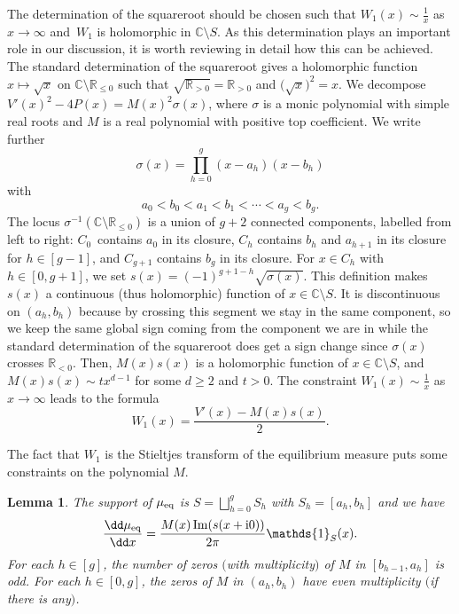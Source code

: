 \documentclass[10pt,a4paper]{amsart}
\numberwithin{equation}{section}
\newtheorem{Lemma}[Theorem]{Lemma}
\newcommand{\ind}{\mathds{1}}
\begin{document}
The determination of the squareroot should be chosen such that $W_1(x) \sim \frac{1}{x}$ as $x \rightarrow \infty$ and~$W_1$ is holomorphic in $\mathbb{C} \setminus S$. As this determination plays an important role in our discussion, it is worth reviewing in detail how this can be achieved. The standard determination of the squareroot gives a holomorphic function $x \mapsto \sqrt{x}$ on $\mathbb{C} \setminus \mathbb{R}_{\leq 0}$ such that $\sqrt{\mathbb{R}_{> 0}} = \mathbb{R}_{> 0}$ and $\bigl(\sqrt{x}\bigr)^2 = x$. We decompose $V'(x)^2 - 4P(x) = M(x)^2 \sigma(x)$, where $\sigma$ is a monic polynomial with simple real roots and $M$ is a real polynomial with positive top coefficient. We write further
\[
\sigma(x) = \prod_{h = 0}^{g} (x - a_h)(x - b_h)
\]
with
\[
a_0 < b_0 < a_1 < b_1 < \cdots < a_g < b_g.
\]
The locus
$\sigma^{-1}(\mathbb{C} \setminus \mathbb{R}_{\leq 0})$ is a union of
$g + 2$ connected components, labelled from left to right: $C_0$~contains $a_0$ in its closure, $C_h$ contains $b_{h}$
and $a_{h + 1}$ in its closure for $h \in [g - 1]$, and $C_{g + 1}$
contains $b_g$ in its closure. For $x \in C_{h}$ with $h \in [0,g+1]$, we set $s(x) = (-1)^{g + 1 -h}\sqrt{\sigma(x)}$. This
definition makes $s(x)$ a continuous (thus holomorphic) function of
$x \in \mathbb{C} \setminus S$. It is discontinuous on $(a_h,b_h)$ because by
crossing this segment we stay in the same component, so
we keep the same global sign coming from the component we are in
while the standard determination of the squareroot does get a sign
change since $\sigma(x)$ crosses $\mathbb{R}_{< 0}$. Then, $M(x)s(x)$ is a holomorphic function of $x \in \mathbb{C}\setminus S$, and $M(x)s(x) \sim t x^{d - 1}$ for some $d \geq 2$ and $t > 0$. The constraint $W_1(x) \sim \frac{1}{x}$ as $x \rightarrow \infty$ leads to the formula
\begin{equation}
\label{W1SM}W_1(x) = \frac{V'(x) - M(x)s(x)}{2}.
\end{equation}

The fact that $W_1$ is the Stieltjes transform of the equilibrium measure puts some constraints on the polynomial $M$.

\begin{Lemma}
\label{lemMmm} The support of $\mu_{{\rm eq}}$ is $S = \bigsqcup_{h = 0}^{g} S_h$ with $S_h = [a_h,b_h]$ and we have
\[
\frac{\dd \mu_{{\rm eq}}}{\dd x} = \frac{M(x)  \operatorname{Im}(s(x + {\rm i}0))}{2\pi} \ind_S(x).
\]
For each $h \in [g]$, the number of zeros $($with multiplicity$)$ of $M$ in $[b_{h - 1},a_h]$ is odd. For each $h \in [0,g]$, the zeros of $M$ in $(a_h,b_h)$ have even multiplicity $($if there is any$)$.
\end{Lemma}
\end{document}
